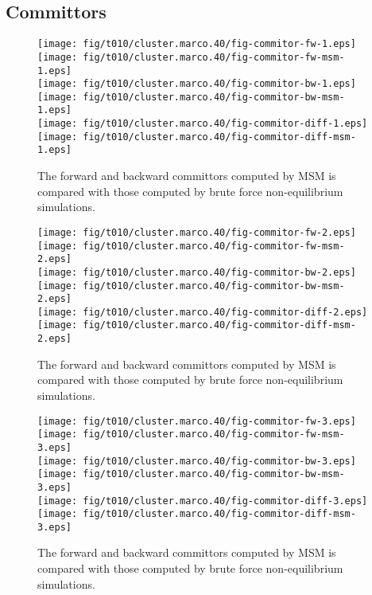 \documentclass[aps, pre, preprint,unsortedaddress,a4paper,onecolumn]{revtex4-1}
\begin{document}
\subsection{Committors}
\begin{figure}
  \centering
  \texttt{[image: fig/t010/cluster.marco.40/fig-commitor-fw-1.eps]}
  \texttt{[image: fig/t010/cluster.marco.40/fig-commitor-fw-msm-1.eps]}\\
  \texttt{[image: fig/t010/cluster.marco.40/fig-commitor-bw-1.eps]}
  \texttt{[image: fig/t010/cluster.marco.40/fig-commitor-bw-msm-1.eps]}\\
  \texttt{[image: fig/t010/cluster.marco.40/fig-commitor-diff-1.eps]}
  \texttt{[image: fig/t010/cluster.marco.40/fig-commitor-diff-msm-1.eps]}
  \caption{The forward and backward committors computed by MSM is compared with those computed by brute force non-equilibrium simulations.}  
\end{figure}

\begin{figure}
  \centering
  \texttt{[image: fig/t010/cluster.marco.40/fig-commitor-fw-2.eps]}
  \texttt{[image: fig/t010/cluster.marco.40/fig-commitor-fw-msm-2.eps]}\\
  \texttt{[image: fig/t010/cluster.marco.40/fig-commitor-bw-2.eps]}
  \texttt{[image: fig/t010/cluster.marco.40/fig-commitor-bw-msm-2.eps]}\\
  \texttt{[image: fig/t010/cluster.marco.40/fig-commitor-diff-2.eps]}
  \texttt{[image: fig/t010/cluster.marco.40/fig-commitor-diff-msm-2.eps]}
  \caption{The forward and backward committors computed by MSM is compared with those computed by brute force non-equilibrium simulations.}  
\end{figure}

\begin{figure}
  \centering
  \texttt{[image: fig/t010/cluster.marco.40/fig-commitor-fw-3.eps]}
  \texttt{[image: fig/t010/cluster.marco.40/fig-commitor-fw-msm-3.eps]}\\
  \texttt{[image: fig/t010/cluster.marco.40/fig-commitor-bw-3.eps]}
  \texttt{[image: fig/t010/cluster.marco.40/fig-commitor-bw-msm-3.eps]}\\
  \texttt{[image: fig/t010/cluster.marco.40/fig-commitor-diff-3.eps]}
  \texttt{[image: fig/t010/cluster.marco.40/fig-commitor-diff-msm-3.eps]}
  \caption{The forward and backward committors computed by MSM is compared with those computed by brute force non-equilibrium simulations.}  
  \label{fig:num-2}
\end{figure}
\end{document}

